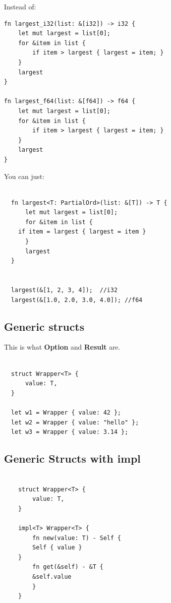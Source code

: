 \documentclass[11pt]{article}
\begin{document}
Instead of:

\begin{verbatim}
fn largest_i32(list: &[i32]) -> i32 {
    let mut largest = list[0];
    for &item in list {
        if item > largest { largest = item; }
    }
    largest
}

fn largest_f64(list: &[f64]) -> f64 {
    let mut largest = list[0];
    for &item in list {
        if item > largest { largest = item; }
    }
    largest
}

\end{verbatim}

You can just:

\begin{verbatim}

  fn largest<T: PartialOrd>(list: &[T]) -> T {
      let mut largest = list[0];
      for &item in list {
  	if item = largest { largest = item }
      }
      largest
  }


  largest(&[1, 2, 3, 4]);  //i32
  largest(&[1.0, 2.0, 3.0, 4.0]); //f64

\end{verbatim}
\subsection{Generic structs}
\label{sec:org511fa53}

This is what \textbf{Option} and \textbf{Result} are.

\begin{verbatim}

  struct Wrapper<T> {
      value: T,
  }

  let w1 = Wrapper { value: 42 };
  let w2 = Wrapper { value: "hello" };
  let w3 = Wrapper { value: 3.14 };

\end{verbatim}
\subsection{Generic Structs with impl}
\label{sec:orgfab826a}

\begin{verbatim}

    struct Wrapper<T> {
        value: T,
    }

    impl<T> Wrapper<T> {
        fn new(value: T) - Self {
    	Self { value }
    }
        fn get(&self) - &T {
    	&self.value
        }
    }
    


\end{verbatim}
\end{document}
